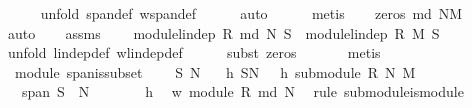 \begin{isabellebody}
\ \ \ \ \isamarkupfalse%
\ {\isacharparenleft}unfold\ span{\isacharunderscore}def\ w{\isachardot}span{\isacharunderscore}def{\isacharparenright}\isanewline
\ \ \ \ \isamarkupfalse%
\ auto\isanewline
\ \ \ \ \isamarkupfalse%
\ {\isacharparenleft}metis{\isacharparenright}\isanewline
\ \ \isamarkupfalse%
\ zeros{\isacharcolon}\ {\isachardoublequoteopen}{\isasymzero}\isactrlbsub md\ N\isactrlesub {\isacharequal}{\isasymzero}\isactrlbsub M\isactrlesub {\isachardoublequoteclose}\ \isamarkupfalse%
\ auto\isanewline
\ \ \isamarkupfalse%
\ assms\ {}\ \isamarkupfalse%
\ {}{\isacharcolon}\ {\isachardoublequoteopen}module{\isachardot}lin{\isacharunderscore}dep\ R\ {\isacharparenleft}md\ N{\isacharparenright}\ S\ {\isacharequal}\ module{\isachardot}lin{\isacharunderscore}dep\ R\ M\ S{\isachardoublequoteclose}\isanewline
\ \ \ \ \isamarkupfalse%
\ {\isacharparenleft}unfold\ lin{\isacharunderscore}dep{\isacharunderscore}def\ w{\isachardot}lin{\isacharunderscore}dep{\isacharunderscore}def{\isacharparenright}\isanewline
\ \ \ \ \isamarkupfalse%
\ {\isacharparenleft}subst\ zeros{\isacharparenright}\ \isanewline
\ \ \ \ \isamarkupfalse%
\ metis\isanewline
{}\isamarkupfalse%
%
\endisatagproof
{\isafoldproof}%
%
\isadelimproof
\isanewline
%
\endisadelimproof
\isanewline
{}\isamarkupfalse%
\ {\isacharparenleft}\ module{\isacharparenright}\ span{\isacharunderscore}is{\isacharunderscore}subset{\isacharcolon}\ \isanewline
\ \ \ S\ N\isanewline
\ \ \ h{}{\isacharcolon}\ {\isachardoublequoteopen}S{\isasymsubseteq}N{\isachardoublequoteclose}\ \ \ h{}{\isacharcolon}\ {\isachardoublequoteopen}submodule\ R\ N\ M{\isachardoublequoteclose}\isanewline
\ \ \ {\isachardoublequoteopen}span\ S\ {\isasymsubseteq}\ N{\isachardoublequoteclose}\isanewline
%
\isadelimproof
%
\endisadelimproof
%
\isatagproof
{}\isamarkupfalse%
\ {\isacharminus}\ \ \isanewline
\ \ \isamarkupfalse%
\ h{}\ \isamarkupfalse%
\ w{\isacharcolon}\ module\ R\ {\isachardoublequoteopen}{\isacharparenleft}md\ N{\isacharparenright}{\isachardoublequoteclose}\ \isamarkupfalse%
\ {\isacharparenleft}rule\ submodule{\isacharunderscore}is{\isacharunderscore}module{\isacharparenright}\isanewline
\ \ \isamarkupfalse%

\end{isabellebody}
